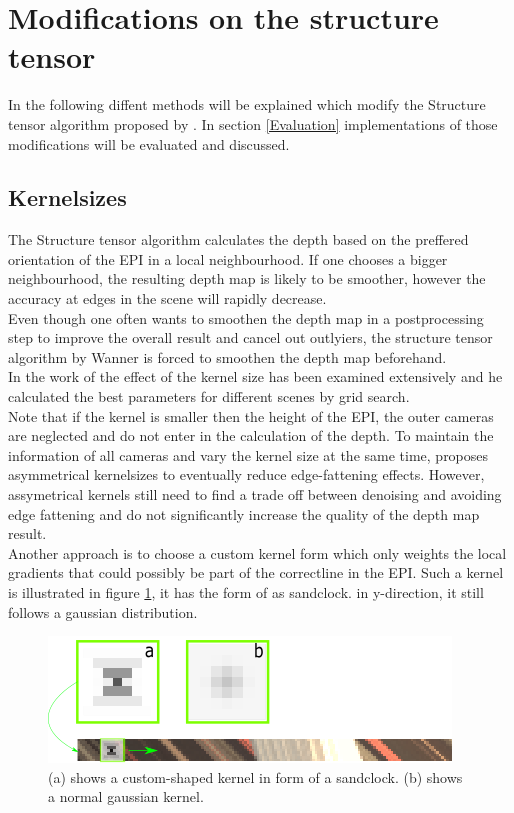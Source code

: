 \documentclass  [
  paper    = a4,
  BCOR     = 10mm,
  twoside,
  fontsize = 12pt,
  fleqn,
  toc      = bibnumbered,
  toc      = listofnumbered,
  numbers  = noendperiod,
  headings = normal,
  listof   = leveldown,
  version  = 3.03
]                                       {scrreprt}
\begin{document}
 \section{Modifications on the structure tensor}
 In the following diffent methods will be explained which modify the Structure tensor algorithm proposed by \cite{wanner2014orientation}. In section \ref{Evaluation} implementations of those modifications will be evaluated and discussed.
 \subsection{Kernelsizes}
 The Structure tensor algorithm calculates the depth based on the preffered orientation of the EPI in a local neighbourhood. If one chooses a bigger neighbourhood, the resulting depth map is likely to be smoother, however the accuracy at edges in the scene will rapidly decrease.\\
 Even though one often wants to smoothen the depth map in a postprocessing step to improve the overall result and cancel out outlyiers, the structure tensor algorithm by Wanner is forced to smoothen the depth map beforehand.\\
 In the work of \cite{wanner2014orientation} the effect of the kernel size has been examined extensively and he calculated the best parameters for different scenes by grid search.\\
 Note that if the kernel is smaller then the height of the EPI, the outer cameras are neglected and do not enter in the calculation of the depth. To maintain the information of all cameras and vary the kernel size at the same time, \cite{diebold2016light} proposes asymmetrical kernelsizes to eventually reduce edge-fattening effects. However, assymetrical kernels still need to find a trade off between denoising and avoiding edge fattening and do not significantly increase the quality of the depth map result.\\
 Another approach is to choose a custom kernel form which only weights the local gradients that could possibly be part of the \glqq correct\grqq line in the EPI. Such a kernel is illustrated in figure \ref{fig:sandclock},  it has the form of as sandclock. in y-direction, it still follows a gaussian distribution.
 \begin{figure}
 	\centering
 	\includegraphics[width=0.7\linewidth]{images/sandclock.png}
 	\caption[Sandclock Kernel]{(a) shows a custom-shaped kernel in form of a sandclock. (b) shows a normal gaussian kernel.}
 	\label{fig:sandclock}
 \end{figure}
 
\end{document}
